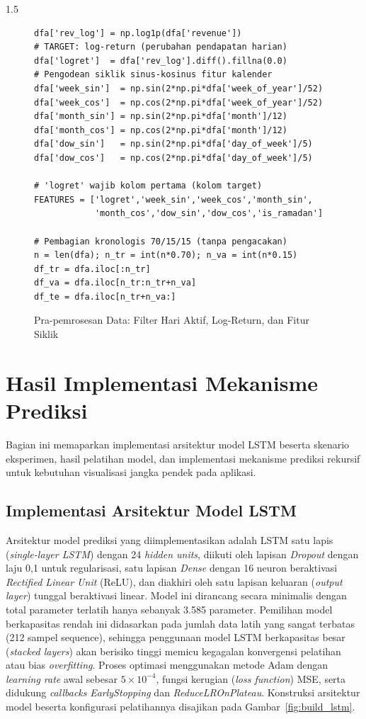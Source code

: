 \documentclass[12pt, a4paper, onecolumn, oneside]{report}
\begin{document}
\begin{spacing}{1.5}
\begin{figure}[H]
\begin{lstlisting}
dfa['rev_log'] = np.log1p(dfa['revenue'])
# TARGET: log-return (perubahan pendapatan harian)
dfa['logret']  = dfa['rev_log'].diff().fillna(0.0)
# Pengodean siklik sinus-kosinus fitur kalender
dfa['week_sin']  = np.sin(2*np.pi*dfa['week_of_year']/52)
dfa['week_cos']  = np.cos(2*np.pi*dfa['week_of_year']/52)
dfa['month_sin'] = np.sin(2*np.pi*dfa['month']/12)
dfa['month_cos'] = np.cos(2*np.pi*dfa['month']/12)
dfa['dow_sin']   = np.sin(2*np.pi*dfa['day_of_week']/5)
dfa['dow_cos']   = np.cos(2*np.pi*dfa['day_of_week']/5)

# 'logret' wajib kolom pertama (kolom target)
FEATURES = ['logret','week_sin','week_cos','month_sin',
            'month_cos','dow_sin','dow_cos','is_ramadan']

# Pembagian kronologis 70/15/15 (tanpa pengacakan)
n = len(dfa); n_tr = int(n*0.70); n_va = int(n*0.15)
df_tr = dfa.iloc[:n_tr]
df_va = dfa.iloc[n_tr:n_tr+n_va]
df_te = dfa.iloc[n_tr+n_va:]
\end{lstlisting}
\caption{Pra-pemrosesan Data: Filter Hari Aktif, Log-Return, dan Fitur Siklik}
\label{fig:preprocessing}
\end{figure}

\section{Hasil Implementasi Mekanisme Prediksi}

Bagian ini memaparkan implementasi arsitektur model LSTM beserta skenario eksperimen, hasil pelatihan model, dan implementasi mekanisme prediksi rekursif untuk kebutuhan visualisasi jangka pendek pada aplikasi.

\subsection{Implementasi Arsitektur Model LSTM}

Arsitektur model prediksi yang diimplementasikan adalah LSTM satu lapis (\textit{single-layer LSTM}) dengan 24 \textit{hidden units}, diikuti oleh lapisan \textit{Dropout} dengan laju 0,1 untuk regularisasi, satu lapisan \textit{Dense} dengan 16 neuron beraktivasi \textit{Rectified Linear Unit} (ReLU), dan diakhiri oleh satu lapisan keluaran (\textit{output layer}) tunggal beraktivasi linear. Model ini dirancang secara minimalis dengan total parameter terlatih hanya sebanyak 3.585 parameter. Pemilihan model berkapasitas rendah ini didasarkan pada jumlah data latih yang sangat terbatas (212 sampel sequence), sehingga penggunaan model LSTM berkapasitas besar (\textit{stacked layers}) akan berisiko tinggi memicu kegagalan konvergensi pelatihan atau bias \textit{overfitting}. Proses optimasi menggunakan metode Adam dengan \textit{learning rate} awal sebesar $5 \times 10^{-4}$, fungsi kerugian (\textit{loss function}) MSE, serta didukung \textit{callbacks} \textit{EarlyStopping} dan \textit{ReduceLROnPlateau}. Konstruksi arsitektur model beserta konfigurasi pelatihannya disajikan pada Gambar~\ref{fig:build_lstm}.


\end{spacing}
\end{document}
